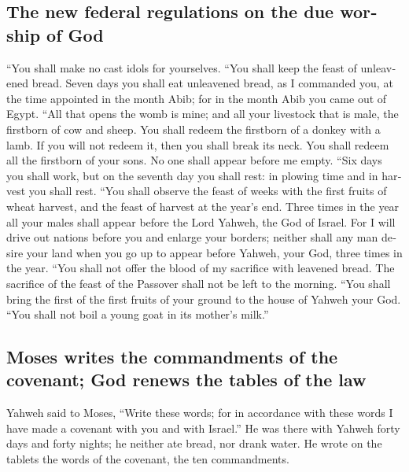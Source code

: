 \begin{paracol}{2}
\begin{otherlanguage}{english}
\hypertarget{the-new-federal-regulations-on-the-due-worship-of-god}{%
\subsection{The new federal regulations on the due worship of
God}\label{the-new-federal-regulations-on-the-due-worship-of-god}}

 ``You shall make no cast idols for yourselves.
 ``You shall keep the feast of unleavened bread. Seven
days you shall eat unleavened bread, as I commanded you, at the time
appointed in the month Abib; for in the month Abib you came out of
Egypt.  ``All that opens the womb is mine; and all your
livestock that is male, the firstborn of cow and sheep. 
You shall redeem the firstborn of a donkey with a lamb. If you will not
redeem it, then you shall break its neck. You shall redeem all the
firstborn of your sons. No one shall appear before me empty.
 ``Six days you shall work, but on the seventh day you
shall rest: in plowing time and in harvest you shall rest.
 ``You shall observe the feast of weeks with the first
fruits of wheat harvest, and the feast of harvest at the year's end.
 Three times in the year all your males shall appear
before the Lord Yahweh, the God of Israel.  For I will
drive out nations before you and enlarge your borders; neither shall any
man desire your land when you go up to appear before Yahweh, your God,
three times in the year.  ``You shall not offer the blood
of my sacrifice with leavened bread. The sacrifice of the feast of the
Passover shall not be left to the morning.  ``You shall
bring the first of the first fruits of your ground to the house of
Yahweh your God. ``You shall not boil a young goat in its mother's
milk.''

\hypertarget{moses-writes-the-commandments-of-the-covenant-god-renews-the-tables-of-the-law}{%
\subsection{Moses writes the commandments of the covenant; God renews
the tables of the
law}\label{moses-writes-the-commandments-of-the-covenant-god-renews-the-tables-of-the-law}}

 Yahweh said to Moses, ``Write these words; for in
accordance with these words I have made a covenant with you and with
Israel.''  He was there with Yahweh forty days and forty
nights; he neither ate bread, nor drank water. He wrote on the tablets
the words of the covenant, the ten commandments.


\end{otherlanguage}
\end{paracol}
